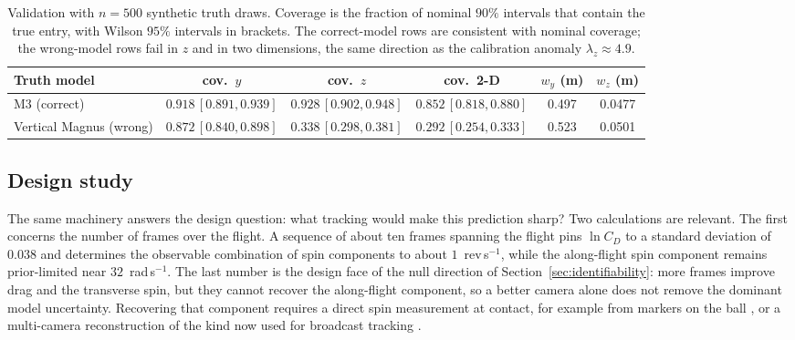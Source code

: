 \begin{table}[t]
  \centering
  \caption{Validation with $n=500$ synthetic truth draws. Coverage is the
  fraction of nominal $90\%$ intervals that contain the true entry, with Wilson
  $95\%$ intervals in brackets. The correct-model rows are consistent with
  nominal coverage; the wrong-model rows fail in $z$ and in two dimensions, the
  same direction as the calibration anomaly $\lambda_z\approx4.9$.}
  \label{tab:validation}
  \footnotesize
  \begin{tabular}{@{}lccccc@{}}
    \toprule
    Truth model & cov.\ $y$ & cov.\ $z$ & cov.\ 2-D & $w_y$ (m) & $w_z$ (m) \\
    \midrule
    M3 (correct) & $0.918\,[0.891,0.939]$ & $0.928\,[0.902,0.948]$ & $0.852\,[0.818,0.880]$ & 0.497 & 0.0477 \\
    Vertical Magnus (wrong) & $0.872\,[0.840,0.898]$ & $0.338\,[0.298,0.381]$ & $0.292\,[0.254,0.333]$ & 0.523 & 0.0501 \\
    \bottomrule
  \end{tabular}
\end{table}

\subsection{Design study}
\label{sec:design-study}

The same machinery answers the design question: what tracking would make this
prediction sharp? Two calculations are relevant. The first concerns the number of
frames over the flight. A sequence of about ten frames spanning the flight pins
$\ln C_D$ to a standard deviation of $0.038$ and determines the observable
combination of spin components to about $1$~rev\,s$^{-1}$, while the along-flight
spin component remains prior-limited near $32$~rad\,s$^{-1}$. The last number is
the design face of the null direction of Section~\ref{sec:identifiability}: more
frames improve drag and the transverse spin, but they cannot recover the
along-flight component, so a better camera alone does not remove the dominant
model uncertainty. Recovering that component requires a direct spin measurement
at contact, for example from markers on the ball \citep{shorter2013}, or a
multi-camera reconstruction of the kind now used for broadcast tracking
\citep{vorobev2025}.

